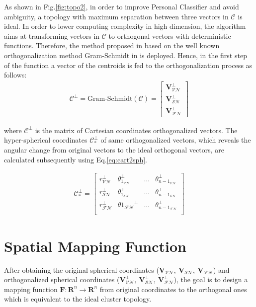 As shown in Fig.\ref{fig:topo2}, in order to improve Personal Classifier and avoid ambiguity, a topology with maximum separation between three vectors in $\mathcal{C}$ is ideal. In order to lower computing complexity in high dimension, the algorithm aims at transforming vectors in $\mathcal{C}$ to orthogonal vectors with deterministic functions. Therefore, the method proposed in \cite{Gram-schmidth2} based on the well known orthogonalization method Gram-Schmidt in \cite{Gram-schmidth1} is deployed. Hence, in the first step of the function a vector of the centroids is fed to the orthogonalization process as follows:
\begin{align}
\mathcal{C}^{\perp}= \text{Gram-Schmidt}(\mathcal{C})
=
\begin{bmatrix}
\mathbf{V}_{\mathcal{VN}}^{\perp} \\
\mathbf{V}_{\mathcal{SN}}^{\perp} \\
\mathbf{V}_{\mathcal{FN}}^{\perp}
\end{bmatrix}
\end{align}

where $\mathcal{C}^{\perp}$ is the matrix of Cartesian coordinates orthogonalized vectors. The hyper-spherical coordinates $\mathcal{C}^{\perp}_{*}$ of same orthogonalized vectors, which reveals the angular change from original vectors to the ideal orthogonal vectors, are calculated subsequently using Eq.\ref{eq:cart2sph}.

\begin{align}
\mathcal{C}^{\perp}_{*} =
\begin{bmatrix}
    r_{\mathcal{VN}}^{\perp} & \theta_{1_{\mathcal{VN}}}^{\perp} & \dots  & \theta_{{n-1}_{\mathcal{VN}}}^{\perp} \\
    r_{\mathcal{SN}}^{\perp} & \theta_{1_{\mathcal{SN}}}^{\perp} & \dots  & \theta_{{n-1}_{\mathcal{SN}}}^{\perp} \\
	r_{\mathcal{FN}}^{\perp} & \theta{1_{\mathcal{FN}}}^{\perp} & \dots  & \theta_{{n-1}_{\mathcal{FN}}}^{\perp} \\
\end{bmatrix}
\end{align}


\section{Spatial Mapping Function}
After obtaining the original spherical coordinates ($\mathbf{V}_{\mathcal{VN}},~\mathbf{V}_{\mathcal{SN}},~\mathbf{V}_{\mathcal{FN}}$) and orthogonalized spherical coordinates ($\mathbf{V}_{\mathcal{VN}}^{\perp},~\mathbf{V}_{\mathcal{SN}}^{\perp},~\mathbf{V}_{\mathcal{FN}}^{\perp}$), the goal is to design a mapping function $\mathbf{F}: \mathbf{R}^n \to \mathbf{R}^n$ from original coordinates to the orthogonal ones which is equivalent to the ideal cluster topology.

